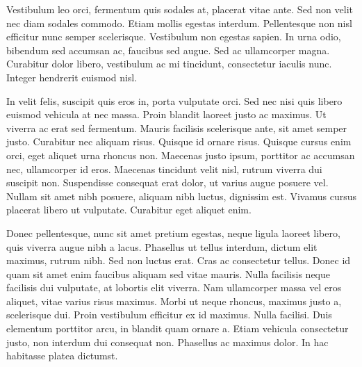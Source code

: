 \documentclass[10pt, conference]{IEEEtran}
\begin{document}
Vestibulum leo orci, fermentum quis sodales at, placerat vitae ante. Sed non velit nec diam sodales commodo. Etiam mollis egestas interdum. Pellentesque non nisl efficitur nunc semper scelerisque. Vestibulum non egestas sapien. In urna odio, bibendum sed accumsan ac, faucibus sed augue. Sed ac ullamcorper magna. Curabitur dolor libero, vestibulum ac mi tincidunt, consectetur iaculis nunc. Integer hendrerit euismod nisl.

In velit felis, suscipit quis eros in, porta vulputate orci. Sed nec nisi quis libero euismod vehicula at nec massa. Proin blandit laoreet justo ac maximus. Ut viverra ac erat sed fermentum. Mauris facilisis scelerisque ante, sit amet semper justo. Curabitur nec aliquam risus. Quisque id ornare risus. Quisque cursus enim orci, eget aliquet urna rhoncus non. Maecenas justo ipsum, porttitor ac accumsan nec, ullamcorper id eros. Maecenas tincidunt velit nisl, rutrum viverra dui suscipit non. Suspendisse consequat erat dolor, ut varius augue posuere vel. Nullam sit amet nibh posuere, aliquam nibh luctus, dignissim est. Vivamus cursus placerat libero ut vulputate. Curabitur eget aliquet enim.

Donec pellentesque, nunc sit amet pretium egestas, neque ligula laoreet libero, quis viverra augue nibh a lacus. Phasellus ut tellus interdum, dictum elit maximus, rutrum nibh. Sed non luctus erat. Cras ac consectetur tellus. Donec id quam sit amet enim faucibus aliquam sed vitae mauris. Nulla facilisis neque facilisis dui vulputate, at lobortis elit viverra. Nam ullamcorper massa vel eros aliquet, vitae varius risus maximus. Morbi ut neque rhoncus, maximus justo a, scelerisque dui. Proin vestibulum efficitur ex id maximus. Nulla facilisi. Duis elementum porttitor arcu, in blandit quam ornare a. Etiam vehicula consectetur justo, non interdum dui consequat non. Phasellus ac maximus dolor. In hac habitasse platea dictumst.

% 
% 
\end{document}
